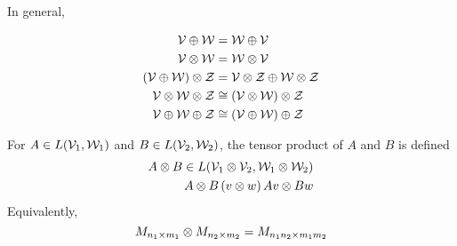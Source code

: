 In general,

\begin{align*}
    \mathcal{V} \oplus \mathcal{W}                                     & = \mathcal{W} \oplus \mathcal{V}                                                  \\
    \mathcal{V} \otimes \mathcal{W}                                    & = \mathcal{W} \otimes \mathcal{V}                                                 \\
    \left(\mathcal{V} \oplus\mathcal{W}\right)\otimes \mathcal{Z} & = \mathcal{V} \otimes \mathcal{Z} \oplus \mathcal{W}\otimes\mathcal{Z}  \\
    \mathcal{V} \otimes \mathcal{W} \otimes \mathcal{Z}           & \cong \left(\mathcal{V} \otimes \mathcal{W}\right) \otimes \mathcal{Z} \\
    \mathcal{V} \oplus \mathcal{W} \oplus \mathcal{Z}             & \cong \left(\mathcal{V} \oplus \mathcal{W}\right) \oplus \mathcal{Z}
\end{align*}

\begin{definition}
    For $A \in L(\mathcal{V}_1, \mathcal{W}_1)$ and $B \in L(\mathcal{V}_2, \mathcal{W}_2)$,
    the tensor product of $A$ and $B$ is defined
    \begin{align*}
        A \otimes B \in L(\mathcal{V}_1 \otimes \mathcal{V}_2, \mathcal{W}_1 \otimes \mathcal{W}_2) \\
        A \otimes B\left(v \otimes w\right) Av \otimes Bw
    \end{align*}
    Equivalently,
    \[M_{n_1\times m_1} \otimes M_{n_2 \times m_2} = M_{n_1n_2 \times m_1m_2}\]
\end{definition}